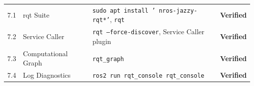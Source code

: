\documentclass[11pt,a4paper]{article}
\begin{document}
\begin{center}
\begin{tabular}{ll>{\raggedright\arraybackslash}p{8.5cm}c}
\midrule
7.1 & rqt Suite & \texttt{sudo apt install '~nros-jazzy-rqt*'}, \texttt{rqt} & \textcolor{primary}{\textbf{Verified}} \\
7.2 & Service Caller & \texttt{rqt --force-discover}, Service Caller plugin & \textcolor{primary}{\textbf{Verified}} \\
7.3 & Computational Graph & \texttt{rqt\_graph} & \textcolor{primary}{\textbf{Verified}} \\
7.4 & Log Diagnostics & \texttt{ros2 run rqt\_console rqt\_console} & \textcolor{primary}{\textbf{Verified}} \\
\bottomrule
\end{tabular}
\end{center}
\end{document}
